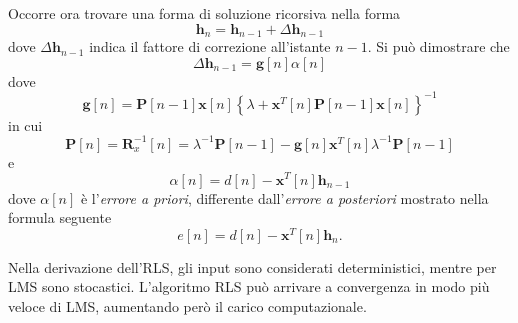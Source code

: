 \documentclass[12pt,a4paper,titlepage]{article}
\begin{document}
Occorre ora trovare una forma di soluzione ricorsiva nella forma 
\begin{equation*}
\mathbf{h}_n = \mathbf{h}_{n-1} + \Delta \mathbf{h}_{n-1}
\end{equation*}
dove $\Delta \mathbf{h}_{n-1}$ indica il fattore di correzione all'istante $n-1$. Si può dimostrare che 
\begin{equation*}
\Delta \mathbf{h}_{n-1} = \mathbf{g}[n]\alpha[n]
\end{equation*}
dove 
\begin{equation*}
\mathbf{g}[n] = \mathbf{P}[n-1]\mathbf{x}[n]\left\{\lambda + \mathbf{x}^T[n] \mathbf{P}[n-1] \mathbf{x}[n]\right\}^{-1}
\end{equation*}
in cui 
\begin{equation*}
\mathbf{P}[n] = \mathbf{R}^{-1}_x[n] = \lambda ^ {-1} \mathbf{P}[n-1] -  \mathbf{g}[n]\mathbf{x}^T[n]\lambda^{-1}\mathbf{P}[n-1]
\end{equation*}
e
\begin{equation*}
\alpha[n] = d[n] - \mathbf{x}^T[n]\mathbf{h}_{n-1}
\end{equation*}
dove $\alpha[n]$ è l'\textit{errore a priori}, differente dall'\textit{errore a posteriori} mostrato nella formula seguente
\begin{equation}
e[n] = d[n] - \mathbf{x}^T[n]\mathbf{h}_{n}.
\end{equation}

Nella derivazione dell'RLS, gli input sono considerati deterministici, mentre per LMS sono stocastici. L'algoritmo RLS può arrivare a convergenza in modo più veloce di LMS, aumentando però il carico computazionale.
\end{document}
